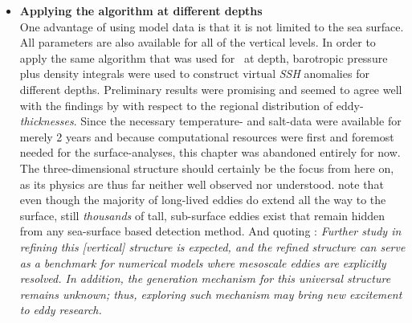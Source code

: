 \begin{itemize}
\setlength\itemsep{2mm}
\item
\textbf{Applying the algorithm at different depths}\\
One advantage of using model data is that it is not limited to the sea surface. All parameters are also available for all of the vertical levels. In order to apply the same algorithm that was used for \SSH~at depth, barotropic pressure plus density integrals were used to construct virtual \textit{SSH} anomalies for different depths. Preliminary results were promising and seemed to agree well with the findings by \citet{Petersen2013} with respect to the regional distribution of eddy-\textit{thicknesses}. Since the necessary temperature- and salt-data were available for merely 2 years and because computational resources were first and foremost needed for the surface-analyses, this chapter was abandoned entirely for now.
The three-dimensional structure should certainly be the focus from here on, as its physics are thus far neither well observed nor understood.  \eg note that even though the majority of long-lived eddies do extend all the way to the surface, still \textit{thousands} of tall, sub-surface eddies exist that remain hidden from any sea-surface based detection method. And quoting \citep{Zhang2013}: \textit{Further study in refining this [vertical] structure is expected, and the refined structure can serve as a benchmark for numerical models where mesoscale eddies are explicitly resolved. In addition, the generation mechanism for this universal structure remains unknown; thus, exploring such mechanism may bring new excitement to eddy research.} \\


\end{itemize}
